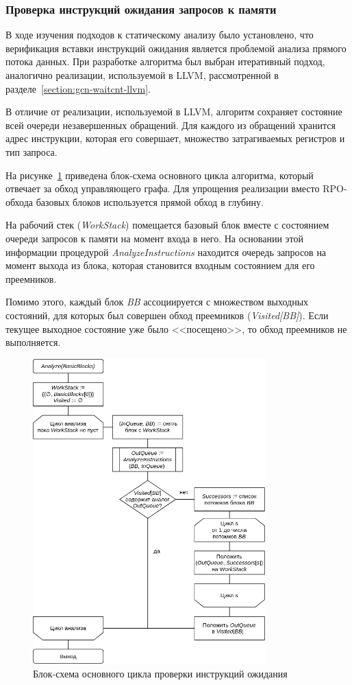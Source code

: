 \documentclass[a4paper,14pt]{extarticle}
\begin{document}
{\subsubsection{Проверка инструкций ожидания запросов к памяти}

В ходе изучения подходов к статическому анализу было установлено, что верификация
вставки инструкций ожидания является проблемой анализа прямого потока данных.
При разработке алгоритма был выбран итеративный подход, аналогично реализации,
используемой в LLVM, рассмотренной в разделе~\ref{section:gcn-waitcnt-llvm}.

В отличие от реализации, используемой в LLVM, алгоритм сохраняет состояние всей очереди
незавершенных обращений. Для каждого из обращений хранится адрес инструкции, которая его
совершает, множество затрагиваемых регистров и тип запроса.

На рисунке~\ref{fig:diagram-waitcnt} приведена блок-схема основного цикла
алгоритма, который отвечает за обход управляющего графа. Для упрощения реализации
вместо RPO-обхода базовых блоков используется прямой обход в глубину.

На рабочий стек (\textit{WorkStack}) помещается базовый блок вместе с состоянием
очереди запросов к памяти на момент входа в него. На основании этой информации
процедурой \textit{AnalyzeInstructions} находится очередь запросов на момент
выхода из блока, которая становится входным состоянием для его преемников.

Помимо этого, каждый блок \textit{BB} ассоциируется с множеством выходных состояний,
для которых был совершен обход преемников (\textit{Visited[BB]}). Если текущее выходное
состояние уже было <<посещено>>, то обход преемников не выполняется.

\begin{figure}[H]
\centering
\includegraphics[width=0.8\textwidth]{diagrams/alg-waitcnt}
\caption{Блок-схема основного цикла проверки инструкций ожидания}
\label{fig:diagram-waitcnt}
\end{figure}

}
\end{document}
